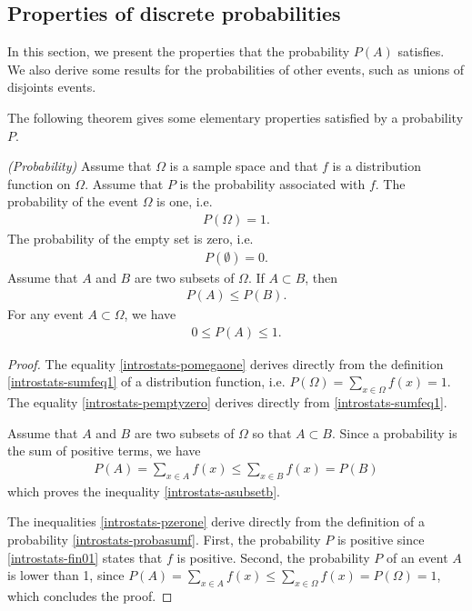
\subsection{Properties of discrete probabilities}
\label{introstats-probaproperties}
In this section, we present the properties that the probability $P(A)$ 
satisfies. We also derive some results for the probabilities of other 
events, such as unions of disjoints events.

The following theorem gives some elementary properties satisfied by a 
probability $P$.

\begin{proposition}
\emph{(Probability)}
\label{introstats-propoproba}
Assume that $\Omega$ is a sample space and that $f$ is a distribution
function on $\Omega$. Assume that $P$ is the probability associated with
$f$. 
The probability of the event $\Omega$ is one, i.e. 
\begin{eqnarray}
P(\Omega) = 1 \label{introstats-pomegaone}.
\end{eqnarray}
The probability of the empty set is zero, i.e. 
\begin{eqnarray}
P(\emptyset) = 0 \label{introstats-pemptyzero}.
\end{eqnarray}
Assume that $A$ and $B$ are two subsets of $\Omega$. 
If $A\subset B$, then
\begin{eqnarray}
P(A) \leq P(B). \label{introstats-asubsetb}
\end{eqnarray}
For any event $A\subset \Omega$, we have 
\begin{eqnarray}
0\leq P(A) \leq 1.  \label{introstats-pzerone}
\end{eqnarray}
\end{proposition}

\begin{proof}
The equality \ref{introstats-pomegaone} derives directly from the definition
\ref{introstats-sumfeq1} of a distribution function,
i.e. $P(\Omega) = \sum_{x\in\Omega} f(x) = 1$.
The equality \ref{introstats-pemptyzero} derives directly from \ref{introstats-sumfeq1}.

Assume that $A$ and $B$ are two subsets of $\Omega$ so that $A\subset B$. 
Since a probability is the sum of positive terms, we have
\begin{eqnarray}
P(A)= \sum_{x\in A} f(x) \leq \sum_{x\in B} f(x) = P(B)
\end{eqnarray}
which proves the inequality \ref{introstats-asubsetb}.

The inequalities \ref{introstats-pzerone} derive directly from the definition
of a probability \ref{introstats-probasumf}.
First, the probability $P$ is positive since \ref{introstats-fin01} states that $f$ is 
positive. Second, the probability $P$ of an event $A$ is lower than 1, since 
$P(A)= \sum_{x\in A} f(x) \leq \sum_{x\in\Omega} f(x) = P(\Omega)= 1$, which concludes the proof.
\end{proof}

